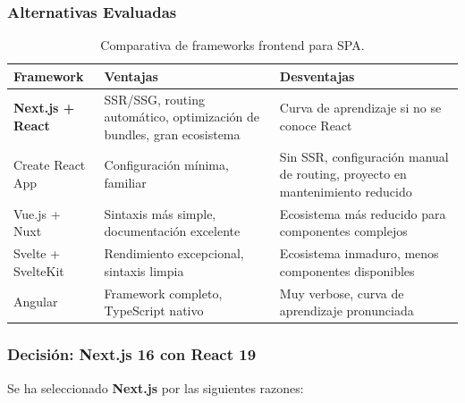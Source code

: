 \subsubsection{Alternativas Evaluadas}

\begin{table}[H]
\centering
\renewcommand{\arraystretch}{1.2}
\begin{tabular}{|l|p{4.5cm}|p{4.5cm}|}
\hline
\rowcolor[gray]{0.85}
\textbf{Framework} & \textbf{Ventajas} & \textbf{Desventajas} \\
\hline
\textbf{Next.js + React} & SSR/SSG, routing automático, optimización de bundles, gran ecosistema & Curva de aprendizaje si no se conoce React \\
\hline
Create React App & Configuración mínima, familiar & Sin SSR, configuración manual de routing, proyecto en mantenimiento reducido \\
\hline
Vue.js + Nuxt & Sintaxis más simple, documentación excelente & Ecosistema más reducido para componentes complejos \\
\hline
Svelte + SvelteKit & Rendimiento excepcional, sintaxis limpia & Ecosistema inmaduro, menos componentes disponibles \\
\hline
Angular & Framework completo, TypeScript nativo & Muy verbose, curva de aprendizaje pronunciada \\
\hline
\end{tabular}
\caption{Comparativa de frameworks frontend para SPA.}
\label{tab:frameworks_frontend}
\end{table}

\subsubsection{Decisión: Next.js 16 con React 19}

Se ha seleccionado \textbf{Next.js} por las siguientes razones:

